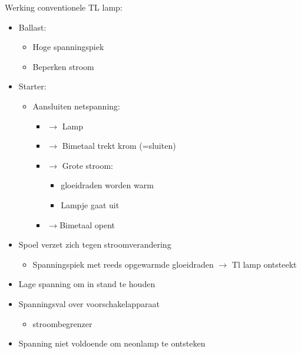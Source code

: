 \documentclass[12pt]{article}
\begin{document}
Werking conventionele TL lamp:\begin{itemize}
    \item Ballast:\begin{itemize}
        \item Hoge spanningspiek 
        \item Beperken stroom
    \end{itemize}
    \item Starter:\begin{itemize}
        \item Aansluiten netspanning:\begin{itemize}
            \item $\rightarrow$ Lamp 
            \item $\rightarrow$ Bimetaal trekt krom (=sluiten)
            \item $\rightarrow$ Grote stroom:\begin{itemize}
                \item gloeidraden worden warm 
                \item Lampje gaat uit
            \end{itemize}
            \item $\rightarrow$Bimetaal opent
        \end{itemize}
    \end{itemize}
    \item Spoel verzet zich tegen stroomverandering\begin{itemize}
        \item Spanningspiek met reeds opgewarmde gloeidraden $\rightarrow$ Tl lamp ontsteekt
    \end{itemize}
    \item Lage spanning om in stand te houden
    \item Spanningsval over voorschakelapparaat\begin{itemize}
        \item stroombegrenzer
    \end{itemize}
    \item Spanning niet voldoende om neonlamp te ontsteken
\end{itemize}
\end{document}

